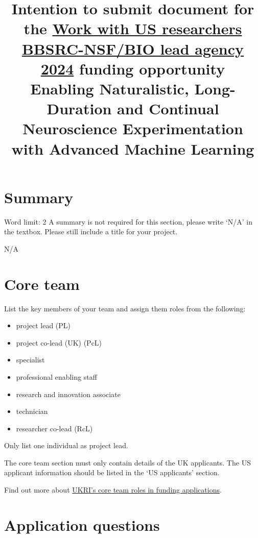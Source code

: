 \documentclass[12in]{article}
\title{Intention to submit document for the
\href{https://www.ukri.org/opportunity/work-with-us-researchers-bbsrc-nsf-bio-lead-agency-2024/}{Work
with US researchers BBSRC-NSF/BIO lead agency 2024} funding
opportunity\\\vspace{.5in}Enabling Naturalistic, Long-Duration and Continual
Neuroscience Experimentation with Advanced Machine Learning}
\begin{document}
\tableofcontents

\pagebreak

\maketitle

\section{Summary}

{\color{red}
Word limit: 2
A summary is not required for this section, please write ‘N/A’ in the textbox.
Please still include a title for your project.
}

N/A

\pagebreak

\section{Core team}
\label{sec:coreTeam}

{\color{red}

List the key members of your team and assign them roles from the following:

\begin{itemize}
    \item project lead (PL)
    \item project co-lead (UK) (PcL)
    \item specialist
    \item professional enabling staff
    \item research and innovation associate
    \item technician
    \item researcher co-lead (RcL)
\end{itemize}

Only list one individual as project lead.

The core team section must only contain details of the UK applicants. The US
applicant information should be listed in the `US applicants' section.

Find out more about
\href{https://www.ukri.org/publications/roles-in-funding-applications/roles-in-funding-applications-eligibility-responsibilities-and-costings-guidance/}{UKRI’s
core team roles in funding applications}.

}



\section{Application questions}
\end{document}
